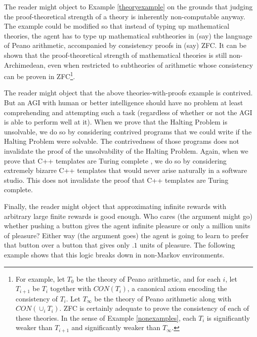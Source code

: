 \documentclass[twoside,11pt]{article}
\begin{document}
The reader might object to Example \ref{theoryexample} on the grounds that
judging the proof-theoretical
strength of a theory is inherently non-computable anyway. The example could be
modified so that instead of typing up mathematical theories, the agent has to
type up mathematical subtheories in (say) the language of Peano arithmetic,
accompanied by consistency proofs in (say) ZFC. It can be shown that the
proof-theoretical strength of mathematical theories is still non-Archimedean,
even when restricted to subtheories of arithmetic whose consistency can be
proven in ZFC\footnote{For example, let $T_0$ be the theory of Peano arithmetic,
and for each $i$, let $T_{i+1}$ be $T_i$ together with $CON(T_i)$, a canonical axiom
encoding the consistency of $T_i$. Let $T_\infty$ be the theory of Peano arithmetic
along with $CON(\cup_i T_i)$. ZFC is certainly adequate to prove the consistency of
each of these theories. In the sense of Example \ref{nonexamples}, each $T_{i}$ is
significantly weaker than $T_{i+1}$ and significantly weaker than $T_\infty$.}.

The reader might object that the above theories-with-proofs example is contrived.
But an AGI with human or better intelligence should have no problem
at least comprehending and attempting such a task (regardless of whether or not
the AGI is able to perform well at it). When we prove that the Halting Problem
is unsolvable, we do so by considering contrived programs that we could write if
the Halting Problem were solvable. The contrivedness of those programs does not
invalidate the proof of the unsolvability of the Halting Problem. Again, when we
prove that C++ templates are Turing complete \citep{veldhuizen}, we do so by
considering extremely
bizarre C++ templates that would never arise naturally in a software
studio. This does not invalidate the proof that C++ templates are Turing complete.

Finally, the reader might object that approximating infinite rewards with arbitrary
large finite rewards is good enough. Who cares (the argument might go) whether
pushing a button gives the agent infinite pleasure or only a million units of pleasure?
Either way (the argument goes) the agent is going to learn to prefer that button
over a button that gives only $.1$ units of pleasure. The following example shows
that this logic breaks down in non-Markov environments.
\end{document}
